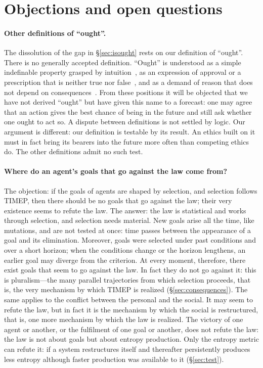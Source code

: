 \documentclass[11pt,a4paper]{article}
\newcommand{\Sref}[1]{\hyperref[#1]{\S\ref{#1}}}
\begin{document}
\section{Objections and open questions}\label{sec:limits}

\paragraph{Other definitions of ``ought''.}
The dissolution of the gap in \Sref{sec:isought} rests on our definition of ``ought''. There is no generally accepted definition. ``Ought'' is understood as a simple indefinable property grasped by intuition~\cite{moore1903}, as an expression of approval or a prescription that is neither true nor false~\cite{ayer1936,hare1952}, and as a demand of reason that does not depend on consequences~\cite{kant1785}. From these positions it will be objected that we have not derived ``ought'' but have given this name to a forecast: one may agree that an action gives the best chance of being in the future and still ask whether one ought to act so. A dispute between definitions is not settled by logic. Our argument is different: our definition is testable by its result. An ethics built on it must in fact bring its bearers into the future more often than competing ethics do. The other definitions admit no such test.

\paragraph{Where do an agent's goals that go against the law come from?}
The objection: if the goals of agents are shaped by selection, and selection follows TIMEP, then there should be no goals that go against the law; their very existence seems to refute the law. The answer: the law is statistical and works through selection, and selection needs material. New goals arise all the time, like mutations, and are not tested at once: time passes between the appearance of a goal and its elimination. Moreover, goals were selected under past conditions and over a short horizon; when the conditions change or the horizon lengthens, an earlier goal may diverge from the criterion. At every moment, therefore, there exist goals that seem to go against the law. In fact they do not go against it: this is pluralism---the many parallel trajectories from which selection proceeds, that is, the very mechanism by which TIMEP is realized (\Sref{sec:consequences}). The same applies to the conflict between the personal and the social. It may seem to refute the law, but in fact it is the mechanism by which the social is restructured, that is, one more mechanism by which the law is realized. The victory of one agent or another, or the fulfilment of one goal or another, does not refute the law: the law is not about goals but about entropy production. Only the entropy metric can refute it: if a system restructures itself and thereafter persistently produces less entropy although faster production was available to it (\Sref{sec:test}).
\end{document}
